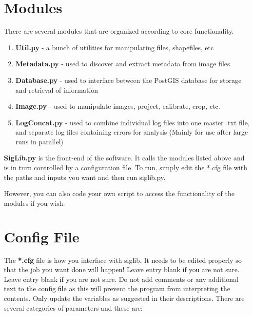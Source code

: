 \documentclass[letterpaper,10pt,openany,oneside]{sphinxmanual}
\begin{document}
\chapter{Modules}
\label{wiki:modules}
There are several modules that are organized according to core
functionality.
\begin{enumerate}
\item {} 
\textbf{Util.py} - a bunch of utilities for manipulating files,
shapefiles, etc

\item {} 
\textbf{Metadata.py} - used to discover and extract metadata from image
files

\item {} 
\textbf{Database.py} - used to interface between the PostGIS database for
storage and retrieval of information

\item {} 
\textbf{Image.py} - used to manipulate images, project, calibrate, crop,
etc.

\item {} 
\textbf{LogConcat.py} - used to combine individual log files into one
master .txt file, and separate log files containing errors for
analysis (Mainly for use after large runs in parallel)

\end{enumerate}

\textbf{SigLib.py} is the front-end of the software. It calls the modules
listed above and is in turn controlled by a configuration file. To run,
simply edit the *.cfg file with the paths and inputs you want and then
run siglib.py.

However, you can also code your own script to access the functionality
of the modules if you wish.


\chapter{Config File}
\label{wiki:config-file}
The \textbf{*.cfg} file is how you interface with siglib. It needs to be
edited properly so that the job you want done will happen! Leave entry
blank if you are not sure. Leave entry blank if you are not sure. Do not
add comments or any additional text to the config file as this will
prevent the program from interpreting the contents. Only update the
variables as suggested in their descriptions. There are several
categories of parameters and these are:
\end{document}
